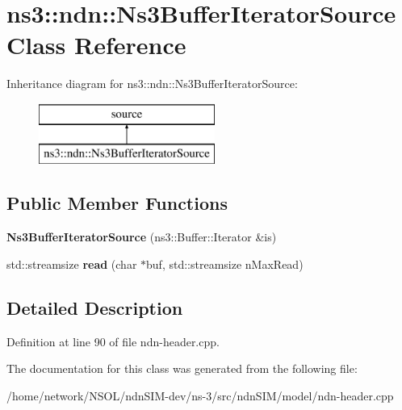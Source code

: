 \hypertarget{classns3_1_1ndn_1_1Ns3BufferIteratorSource}{}\section{ns3\+:\+:ndn\+:\+:Ns3\+Buffer\+Iterator\+Source Class Reference}
\label{classns3_1_1ndn_1_1Ns3BufferIteratorSource}
Inheritance diagram for ns3\+:\+:ndn\+:\+:Ns3\+Buffer\+Iterator\+Source\+:\begin{figure}[H]
\begin{center}
\leavevmode
\includegraphics[height=2.000000cm]{classns3_1_1ndn_1_1Ns3BufferIteratorSource}
\end{center}
\end{figure}
\subsection*{Public Member Functions}
\begin{DoxyCompactItemize}
\item 
{\bfseries Ns3\+Buffer\+Iterator\+Source} (ns3\+::\+Buffer\+::\+Iterator \&is)\hypertarget{classns3_1_1ndn_1_1Ns3BufferIteratorSource_a94878812696ceefe663abe90d7884f2c}{}\label{classns3_1_1ndn_1_1Ns3BufferIteratorSource_a94878812696ceefe663abe90d7884f2c}

\item 
std\+::streamsize {\bfseries read} (char $\ast$buf, std\+::streamsize n\+Max\+Read)\hypertarget{classns3_1_1ndn_1_1Ns3BufferIteratorSource_a7f8e60e05af69b5bf1aa7d17a7ca21c3}{}\label{classns3_1_1ndn_1_1Ns3BufferIteratorSource_a7f8e60e05af69b5bf1aa7d17a7ca21c3}

\end{DoxyCompactItemize}


\subsection{Detailed Description}


Definition at line 90 of file ndn-\/header.\+cpp.



The documentation for this class was generated from the following file\+:\begin{DoxyCompactItemize}
\item 
/home/network/\+N\+S\+O\+L/ndn\+S\+I\+M-\/dev/ns-\/3/src/ndn\+S\+I\+M/model/ndn-\/header.\+cpp\end{DoxyCompactItemize}
